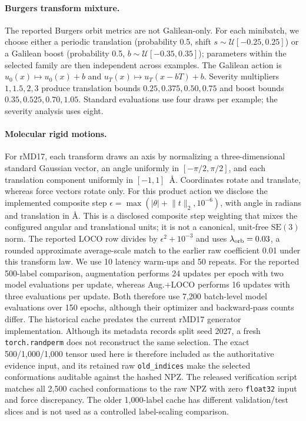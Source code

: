 \paragraph{Burgers transform mixture.}
The reported Burgers orbit metrics are not Galilean-only.  For each minibatch, we
choose either a periodic translation (probability 0.5, shift
\(s\sim\mathcal U[-0.25,0.25]\)) or a Galilean boost (probability 0.5,
\(b\sim\mathcal U[-0.35,0.35]\)); parameters within the selected family are then
independent across examples.  The Galilean action is
\(u_0(x)\mapsto u_0(x)+b\) and
\(u_T(x)\mapsto u_T(x-bT)+b\).  Severity multipliers
\(1,1.5,2,3\) produce translation bounds
\(0.25,0.375,0.50,0.75\) and boost bounds
\(0.35,0.525,0.70,1.05\).  Standard evaluations use four draws per example;
the severity analysis uses eight.

\paragraph{Molecular rigid motions.}
For rMD17, each transform draws an axis by normalizing a three-dimensional
standard Gaussian vector, an angle uniformly in \([-\pi/2,\pi/2]\), and each
translation component uniformly in \([-1,1]\)~\AA.  Coordinates rotate and
translate, whereas force vectors rotate only.  For this product action we disclose
the implemented composite step
\(\epsilon=\max(|\theta|+\lVert t\rVert_2,10^{-6})\), with angle in radians and
translation in \AA.  This is a disclosed composite step weighting that mixes the
configured angular and translational units; it is not a canonical, unit-free
\(\mathrm{SE}(3)\) norm.  The reported LOCO row divides by
\(\epsilon^2+10^{-3}\) and uses
\(\lambda_{\rm orb}=0.03\), a rounded approximate average-scale match to the
earlier raw coefficient 0.01 under this transform law.  We use 10 latency warm-ups
and 50 repeats.
For the reported 500-label comparison, augmentation performs 24 updates per epoch
with two model evaluations per update, whereas Aug.+LOCO performs 16 updates with
three evaluations per update.  Both therefore use 7,200 batch-level model
evaluations over 150 epochs, although their optimizer and backward-pass counts
differ.
The historical cache predates the current rMD17 generator implementation.  Although
its metadata records split seed 2027, a fresh \texttt{torch.randperm} does not
reconstruct the same selection.  The exact 500/1,000/1,000 tensor used here is
therefore included as the authoritative evidence input, and its retained raw
\texttt{old\_indices} make the selected conformations auditable against the hashed
NPZ.  The released verification script matches all 2,500 cached conformations to
the raw NPZ with zero \texttt{float32} input and force discrepancy.  The older
1,000-label cache has different validation/test slices and is not
used as a controlled label-scaling comparison.

